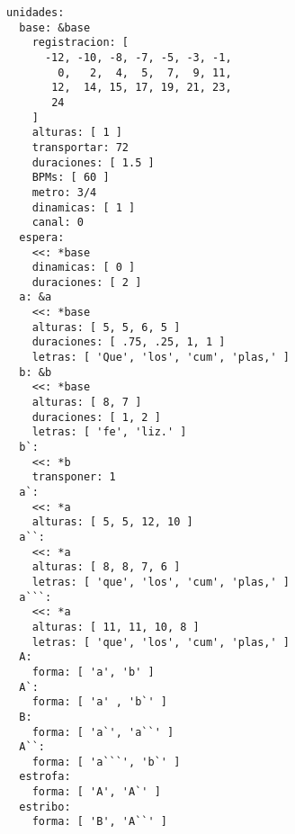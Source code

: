 \begin{itemize}
{}
\begin{verbatim}
unidades: 
  base: &base 
    registracion: [ 
      -12, -10, -8, -7, -5, -3, -1,
        0,   2,  4,  5,  7,  9, 11,
       12,  14, 15, 17, 19, 21, 23,
       24
    ]
    alturas: [ 1 ] 
    transportar: 72 
    duraciones: [ 1.5 ]
    BPMs: [ 60 ]
    metro: 3/4
    dinamicas: [ 1 ]
    canal: 0
  espera:
    <<: *base
    dinamicas: [ 0 ] 
    duraciones: [ 2 ]
  a: &a 
    <<: *base
    alturas: [ 5, 5, 6, 5 ] 
    duraciones: [ .75, .25, 1, 1 ]
    letras: [ 'Que', 'los', 'cum', 'plas,' ]
  b: &b 
    <<: *base
    alturas: [ 8, 7 ] 
    duraciones: [ 1, 2 ]
    letras: [ 'fe', 'liz.' ]
  b`: 
    <<: *b
    transponer: 1
  a`: 
    <<: *a
    alturas: [ 5, 5, 12, 10 ] 
  a``: 
    <<: *a
    alturas: [ 8, 8, 7, 6 ] 
    letras: [ 'que', 'los', 'cum', 'plas,' ]
  a```: 
    <<: *a
    alturas: [ 11, 11, 10, 8 ] 
    letras: [ 'que', 'los', 'cum', 'plas,' ]
  A: 
    forma: [ 'a', 'b' ] 
  A`: 
    forma: [ 'a' , 'b`' ]
  B: 
    forma: [ 'a`', 'a``' ] 
  A``: 
    forma: [ 'a```', 'b`' ] 
  estrofa: 
    forma: [ 'A', 'A`' ]
  estribo: 
    forma: [ 'B', 'A``' ]

\end{verbatim}

\end{itemize}

\setlength{\parskip}{6pt plus 2pt minus 1pt}